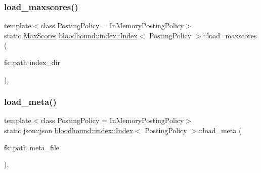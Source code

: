 \subsubsection{\texorpdfstring{load\+\_\+maxscores()}{load\_maxscores()}}
{\footnotesize\ttfamily template$<$class Posting\+Policy = In\+Memory\+Posting\+Policy$>$ \\
static \hyperlink{namespacebloodhound_a687d80c6f992eba8b820bf30a482f4b4}{Max\+Scores} \hyperlink{classbloodhound_1_1index_1_1Index}{bloodhound\+::index\+::\+Index}$<$ Posting\+Policy $>$\+::load\+\_\+maxscores (\begin{DoxyParamCaption}\item[{fs\+::path}]{index\+\_\+dir }\end{DoxyParamCaption})\hspace{0.3cm}{\ttfamily [inline]}, {\ttfamily [static]}}

\mbox{\label{classbloodhound_1_1index_1_1Index_af0d9b72f7cf6b54d7bddbccd3c1898ce}} 
\subsubsection{\texorpdfstring{load\+\_\+meta()}{load\_meta()}}
{\footnotesize\ttfamily template$<$class Posting\+Policy = In\+Memory\+Posting\+Policy$>$ \\
static json\+::json \hyperlink{classbloodhound_1_1index_1_1Index}{bloodhound\+::index\+::\+Index}$<$ Posting\+Policy $>$\+::load\+\_\+meta (\begin{DoxyParamCaption}\item[{fs\+::path}]{meta\+\_\+file }\end{DoxyParamCaption})\hspace{0.3cm}{\ttfamily [inline]}, {\ttfamily [static]}}

\mbox{\label{classbloodhound_1_1index_1_1Index_a24cadb41178b2cc81cf8f3e32a5dd516}} 
